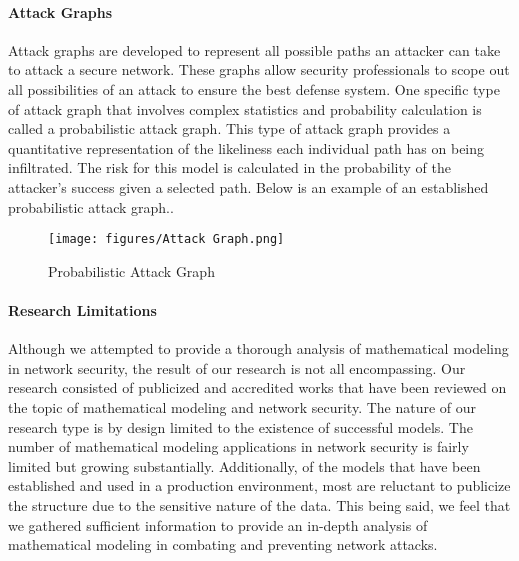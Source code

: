 \documentclass{article}
\begin{document}
\paragraph{Attack Graphs}
Attack graphs are developed to represent all possible paths an attacker can take to attack a secure network.  These graphs allow security professionals to scope out all possibilities of an attack to ensure the best defense system. One specific type of attack graph that involves complex statistics and probability calculation is called a probabilistic attack graph. This type of attack graph provides a quantitative representation of the likeliness each individual path has on being infiltrated. The risk for this model is calculated in the probability of the attacker’s success given a selected path. Below is an example of an established probabilistic attack graph.\cite{wang2017security}.

\begin{figure}
    \centering
    \texttt{[image: figures/Attack Graph.png]}
    \caption{Probabilistic Attack Graph}
    \label{fig:enter-label}
\end{figure}
\paragraph{Research Limitations}
Although we attempted to provide a thorough analysis of mathematical modeling in network security, the result of our research is not all encompassing. Our research consisted of publicized and accredited works that have been reviewed on the topic of mathematical modeling and network security.  The nature of our research type is by design limited to the existence of successful models. The number of mathematical modeling applications in network security is fairly limited but growing substantially. Additionally, of the models that have been established and used in a production environment, most are reluctant to publicize the structure due to the sensitive nature of the data. This being said, we feel that we gathered sufficient information to provide an in-depth analysis of mathematical modeling in combating and preventing network attacks. 
\end{document}
